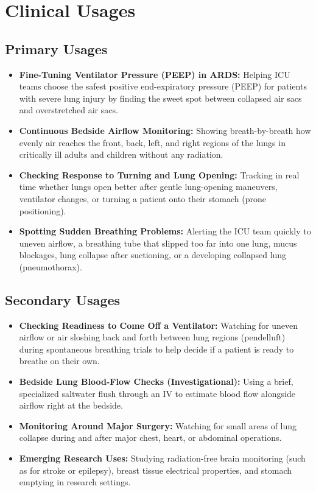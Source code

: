 \section{Clinical Usages}

\subsection{Primary Usages}
\begin{itemize}
    \item \textbf{Fine-Tuning Ventilator Pressure (PEEP) in ARDS:} Helping ICU teams choose the safest positive end-expiratory pressure (PEEP) for patients with severe lung injury by finding the sweet spot between collapsed air sacs and overstretched air sacs.
    \item \textbf{Continuous Bedside Airflow Monitoring:} Showing breath-by-breath how evenly air reaches the front, back, left, and right regions of the lungs in critically ill adults and children without any radiation.
    \item \textbf{Checking Response to Turning and Lung Opening:} Tracking in real time whether lungs open better after gentle lung-opening maneuvers, ventilator changes, or turning a patient onto their stomach (prone positioning).
    \item \textbf{Spotting Sudden Breathing Problems:} Alerting the ICU team quickly to uneven airflow, a breathing tube that slipped too far into one lung, mucus blockages, lung collapse after suctioning, or a developing collapsed lung (pneumothorax).
\end{itemize}

\subsection{Secondary Usages}
\begin{itemize}
    \item \textbf{Checking Readiness to Come Off a Ventilator:} Watching for uneven airflow or air sloshing back and forth between lung regions (pendelluft) during spontaneous breathing trials to help decide if a patient is ready to breathe on their own.
    \item \textbf{Bedside Lung Blood-Flow Checks (Investigational):} Using a brief, specialized saltwater flush through an IV to estimate blood flow alongside airflow right at the bedside.
    \item \textbf{Monitoring Around Major Surgery:} Watching for small areas of lung collapse during and after major chest, heart, or abdominal operations.
    \item \textbf{Emerging Research Uses:} Studying radiation-free brain monitoring (such as for stroke or epilepsy), breast tissue electrical properties, and stomach emptying in research settings.
\end{itemize}

